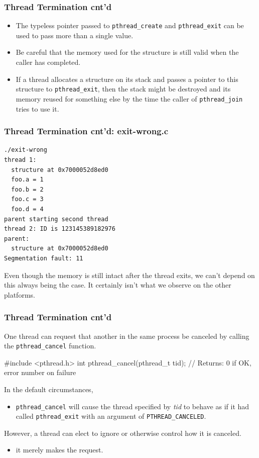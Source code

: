 \documentclass[newPxFont,sthlmFooter,nooffset]{beamer}
\begin{document}
\begin{frame}[t]
  \frametitle{Thread Termination cnt'd}
  \begin{itemize}
  \item The typeless pointer passed to \texttt{pthread\_create} and
    \texttt{pthread\_exit} can be used to pass more than a single
    value.
  \item Be careful that the memory used for the structure is still
    valid when the caller has completed.
  \item If a thread allocates a structure on its stack and passes a
    pointer to this structure to \texttt{pthread\_exit}, then the
    stack might be destroyed and its memory reused for something else
    by the time the caller of \texttt{pthread\_join} tries to use it.
  \end{itemize}

\end{frame}

\begin{frame}
  \frametitle{Thread Termination cnt'd: exit-wrong.c}

  

\begin{verbatim}
./exit-wrong
thread 1:
  structure at 0x7000052d8ed0
  foo.a = 1
  foo.b = 2
  foo.c = 3
  foo.d = 4
parent starting second thread
thread 2: ID is 123145389182976
parent:
  structure at 0x7000052d8ed0
Segmentation fault: 11
\end{verbatim}

Even though the memory is still intact after the thread exits, we can’t depend on this always being the case. It certainly isn’t what we observe on the other platforms.
\end{frame}


\begin{frame}[fragile,t]
  \frametitle{Thread Termination cnt'd}
One thread can request that another in the same process be canceled by calling the \texttt{pthread\_cancel} function.

\begin{codedef}
#include <pthread.h>
int pthread_cancel(pthread_t tid);
// Returns: 0 if OK, error number on failure
\end{codedef}

In the default circumstances, 
\begin{itemize}
\item \texttt{pthread\_cancel} will cause the thread specified by
  \textit{tid} to behave as if it had called \texttt{pthread\_exit}
  with an argument of \texttt{PTHREAD\_CANCELED}.
\end{itemize}

However, a thread can elect to ignore or otherwise control how it is canceled.
\begin{itemize}
\item it merely makes the request.
\end{itemize}

\end{frame}
\end{document}
